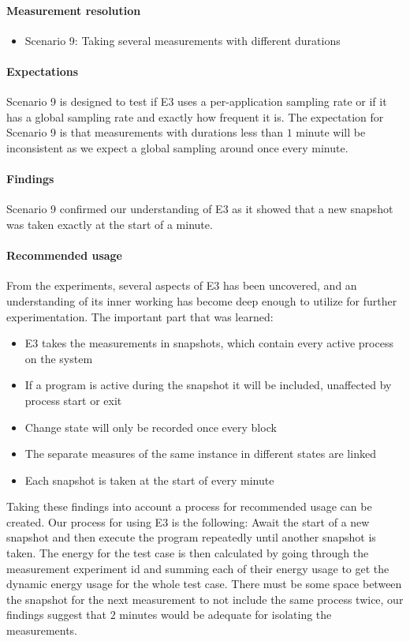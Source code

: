 \paragraph{Measurement resolution}

\begin{itemize}
    \item Scenario 9: Taking several measurements with different durations
\end{itemize}

\paragraph{Expectations}
Scenario 9 is designed to test if E3 uses a per-application sampling rate or if it has a global sampling rate and exactly how frequent it is. The expectation for Scenario 9 is that measurements with durations less than $1$ minute will be inconsistent as we expect a global sampling around once every minute.

\paragraph{Findings}
Scenario 9 confirmed our understanding of E3 as it showed that a new snapshot was taken exactly at the start of a minute.

\paragraph {Recommended usage}
From the experiments, several aspects of E3 has been uncovered, and an understanding of its inner working has become deep enough to utilize for further experimentation. The important part that was learned:

\begin{itemize}
    \item E3 takes the measurements in snapshots, which contain every active process on the system
    \item If a program is active during the snapshot it will be included, unaffected by process start or exit
    \item Change state will only be recorded once every block
    \item The separate measures of the same instance in different states are linked
    \item Each snapshot is taken at the start of every minute
\end{itemize} 

Taking these findings into account a process for recommended usage can be created. Our process for using E3 is the following: Await the start of a new snapshot and then execute the program repeatedly until another snapshot is taken. The energy for the test case is then calculated by going through the measurement experiment id and summing each of their energy usage to get the dynamic energy usage for the whole test case. There must be some space between the snapshot for the next measurement to not include the same process twice, our findings suggest that $2$ minutes would be adequate for isolating the measurements.    